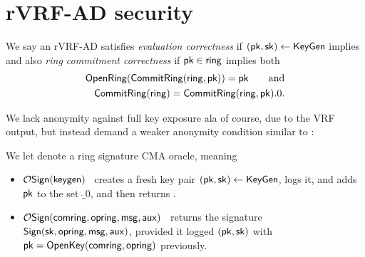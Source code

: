 
\section{{r}VRF-AD security}
\label{sec:rvrf_games}


\begin{definition}
We say an rVRF-AD satisfies {\em evaluation correctness} if
$(\mathsf{pk},\mathsf{sk}) \leftarrow {\ensuremath{\mathsf{KeyGen}}}$ implies
\def\tmpC{\Eval(\sk,\msg) = \Verify(\pk,\msg,\aux,\Sign(\sk,\msg,\aux))}
\eprint{$\tmpC$, succeeds}{$$ \tmpC, $$}
and also {\em ring commitment correctness} if
$\mathsf{pk} \in \mathsf{ring}$ implies both
\def\tmpA{\OpenRing(\CommitRing(\ring,\pk)) = \pk}
\def\tmpB{\CommitRing(\ring) = \CommitRing(\ring,\pk).0} 
\eprint{$$ \tmpA \quad\textrm{and}\quad \tmpB \mathperiod $$}%
{$$ \begin{aligned}
   \tmpA \qquad\textrm{and} \\
   \tmpB \mathperiod
\end{aligned} $$}
\end{definition}

We lack anonymity against full key exposure ala
 \cite[pp. 6 Def. 4]{cryptoeprint:2005:304} of course, due to the VRF output,
but instead demand a weaker anonymity condition similar to
 \cite[pp. 5 Def. 3]{cryptoeprint:2005:304}:

\begin{definition}\label{def:rvrf_sign_oracle}
We let  denote a ring signature CMA oracle, meaning
\begin{itemize}
\item $\mathcal{O}\mathsf{Sign}(\mathsf{keygen})$ \, 
 creates a fresh key pair $(\mathsf{pk},\mathsf{sk}) \leftarrow {\ensuremath{\mathsf{KeyGen}}}$, logs it, and
 adds $\mathsf{pk}$ to the set $\ring_0$, and then returns \pk.
\item $\mathcal{O}\mathsf{Sign}(\mathsf{comring},\mathsf{opring},\mathsf{msg},\mathsf{aux})$ \,
 returns the signature ${\mathsf{Sign}}(\mathsf{sk},\mathsf{opring},\mathsf{msg},\mathsf{aux})$,
 provided it logged $(\mathsf{pk},\mathsf{sk})$ with $\mathsf{pk} = {\mathsf{OpenKey}}(\mathsf{comring},\mathsf{opring})$ previously.
\end{itemize}
\end{definition}


